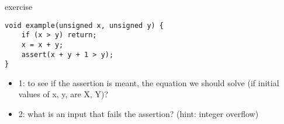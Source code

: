 \begin{frame}[fragile,label=symExecExer]{exercise}
\begin{lstlisting}
void example(unsigned x, unsigned y) {
    if (x > y) return;
    x = x + y;
    assert(x + y + 1 > y);
}
\end{lstlisting}
\begin{itemize}
\item 1: to see if the assertion is meant, the equation we should solve (if initial values of x, y, are X, Y)?
\item 2: what is an input that fails the assertion? (hint: integer overflow)
\end{itemize}
\end{frame}
